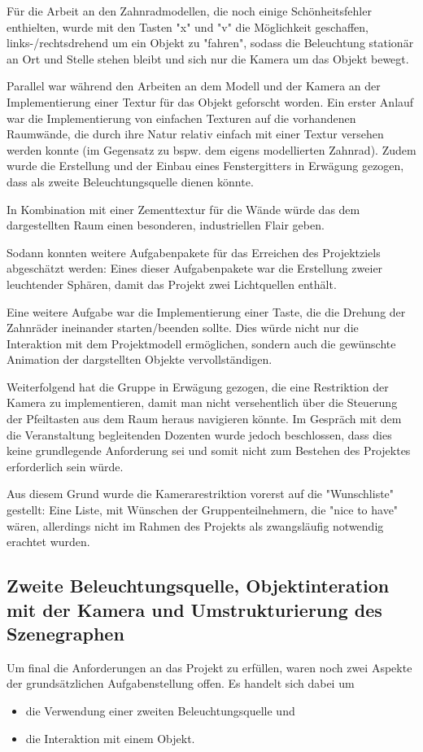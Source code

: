 \documentclass{article}
\begin{document}
Für die Arbeit an den Zahnradmodellen, die noch einige Schönheitsfehler enthielten, wurde mit den Tasten "x" und "v" die Möglichkeit geschaffen, links-/rechtsdrehend um ein Objekt zu "fahren", sodass die Beleuchtung stationär an Ort und Stelle stehen bleibt und sich nur die Kamera um das Objekt bewegt. 

Parallel war während den Arbeiten an dem Modell und der Kamera an der Implementierung einer Textur für das Objekt geforscht worden. 
Ein erster Anlauf war die Implementierung von einfachen Texturen auf die vorhandenen Raumwände, die durch ihre Natur relativ einfach mit einer Textur versehen werden konnte (im Gegensatz zu bspw. dem eigens modellierten Zahnrad). 
Zudem wurde die Erstellung und der Einbau eines Fenstergitters in Erwägung gezogen, dass als zweite Beleuchtungsquelle dienen könnte. 

In Kombination mit einer Zementtextur für die Wände würde das dem dargestellten Raum einen besonderen, industriellen Flair geben. 


Sodann konnten weitere Aufgabenpakete für das Erreichen des Projektziels abgeschätzt werden: 
Eines dieser Aufgabenpakete war die Erstellung zweier leuchtender Sphären, damit das Projekt zwei Lichtquellen  enthält. 

Eine weitere Aufgabe war die Implementierung einer Taste, die die Drehung der Zahnräder ineinander starten/beenden sollte. 
Dies würde nicht nur die Interaktion mit dem Projektmodell ermöglichen, sondern auch die gewünschte Animation der dargstellten Objekte vervollständigen. 

Weiterfolgend hat die Gruppe in Erwägung gezogen, die eine Restriktion der Kamera zu implementieren, damit man nicht versehentlich über die Steuerung der Pfeiltasten aus dem Raum heraus navigieren könnte. 
Im Gespräch mit dem die Veranstaltung begleitenden Dozenten wurde jedoch beschlossen, dass dies keine grundlegende Anforderung sei und somit nicht zum Bestehen des Projektes erforderlich sein würde. 

Aus diesem Grund wurde die Kamerarestriktion vorerst auf die "Wunschliste" gestellt: 
Eine Liste, mit Wünschen der Gruppenteilnehmern, die "nice to have" wären, allerdings nicht im Rahmen des Projekts als zwangsläufig notwendig erachtet wurden. 



\subsection{Zweite Beleuchtungsquelle, Objektinteration mit der Kamera und Umstrukturierung des Szenegraphen}
Um final die Anforderungen an das Projekt zu erfüllen, waren noch zwei Aspekte der grundsätzlichen Aufgabenstellung offen. 
Es handelt sich dabei um 
\begin{itemize}
    \item die Verwendung einer zweiten Beleuchtungsquelle und
    \item die Interaktion mit einem Objekt. 
\end{itemize}
\end{document}
